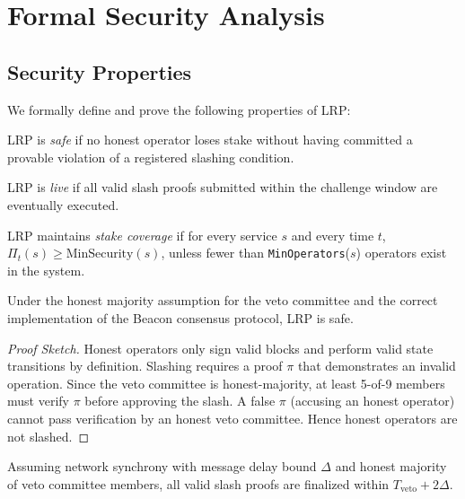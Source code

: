 \section{Formal Security Analysis}

\label{sec:security}

\subsection{Security Properties}

We formally define and prove the following properties of LRP:

\begin{definition}[Safety]
LRP is \emph{safe} if no honest operator loses stake without having committed a
provable violation of a registered slashing condition.
\end{definition}

\begin{definition}[Liveness]
LRP is \emph{live} if all valid slash proofs submitted within the challenge window are
eventually executed.
\end{definition}

\begin{definition}
LRP maintains \emph{stake coverage} if for every service $s$ and every time $t$,
$\Pi_t(s) \geq \text{MinSecurity}(s)$, unless fewer than \texttt{MinOperators}($s$) operators
exist in the system.
\end{definition}

\begin{theorem}
Under the honest majority assumption for the veto committee and the correct implementation
of the Beacon consensus protocol, LRP is safe.
\end{theorem}

\begin{proof}[Proof Sketch]
Honest operators only sign valid blocks and perform valid state transitions by definition.
Slashing requires a proof $\pi$ that demonstrates an invalid operation. Since the veto
committee is honest-majority, at least 5-of-9 members must verify $\pi$ before approving
the slash. A false $\pi$ (accusing an honest operator) cannot pass verification by an
honest veto committee. Hence honest operators are not slashed.
\end{proof}

\begin{theorem}
Assuming network synchrony with message delay bound $\Delta$ and honest majority of
veto committee members, all valid slash proofs are finalized within
$T_{\text{veto}} + 2\Delta$.
\end{theorem}

